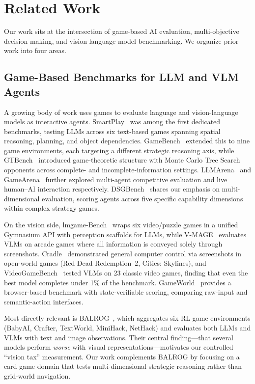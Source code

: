 \documentclass[11pt]{article}
\begin{document}
\section{Related Work}
\label{sec:related}

Our work sits at the intersection of game-based AI evaluation, multi-objective
decision making, and vision-language model benchmarking. We organize prior work
into four areas.

\subsection{Game-Based Benchmarks for LLM and VLM Agents}

A growing body of work uses games to evaluate language and vision-language
models as interactive agents. SmartPlay~\citep{wu2024smartplay} was among the
first dedicated benchmarks, testing LLMs across six text-based games spanning
spatial reasoning, planning, and object dependencies. GameBench~\citep{costarelli2024gamebench}
extended this to nine game environments, each targeting a different strategic
reasoning axis, while GTBench~\citep{duan2024gtbench} introduced game-theoretic
structure with Monte Carlo Tree Search opponents across complete- and
incomplete-information settings. LLMArena~\citep{chen2024llmarena} and
GameArena~\citep{hu2025gamearena} further explored multi-agent competitive
evaluation and live human--AI interaction respectively.
DSGBench~\citep{tang2025dsgbench} shares our emphasis on multi-dimensional
evaluation, scoring agents across five specific capability dimensions within
complex strategy games.

On the vision side, lmgame-Bench~\citep{hu2026lmgamebench} wraps six
video/puzzle games in a unified Gymnasium API with perception scaffolds for
LLMs, while V-MAGE~\citep{zheng2025vmage} evaluates VLMs on arcade games
where all information is conveyed solely through screenshots.
Cradle~\citep{tan2025cradle} demonstrated general computer control via
screenshots in open-world games (Red Dead Redemption~2, Cities: Skylines),
and VideoGameBench~\citep{zhang2025videogamebench} tested VLMs on 23 classic
video games, finding that even the best model completes under 1\% of the
benchmark. GameWorld~\citep{ouyang2026gameworld} provides a browser-based
benchmark with state-verifiable scoring, comparing raw-input and
semantic-action interfaces.

Most directly relevant is BALROG~\citep{paglieri2025balrog}, which aggregates
six RL game environments (BabyAI, Crafter, TextWorld, MiniHack, NetHack) and
evaluates both LLMs and VLMs with text and image observations. Their central
finding---that several models perform \emph{worse} with visual
representations---motivates our controlled ``vision tax'' measurement. Our work
complements BALROG by focusing on a card game domain that tests
multi-dimensional strategic reasoning rather than grid-world navigation.
\end{document}
